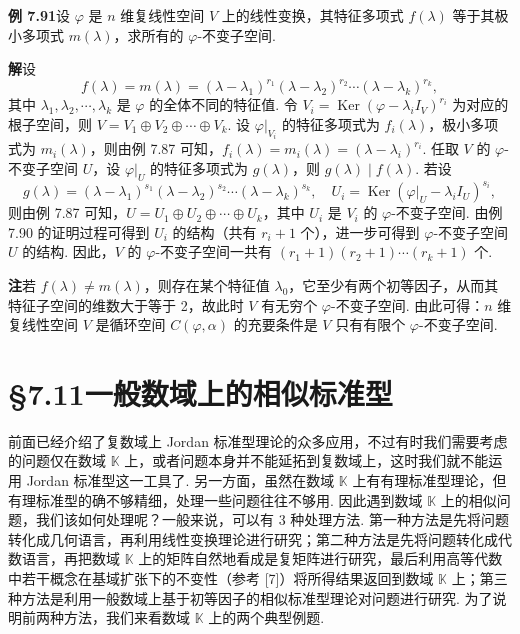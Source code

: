 \documentclass[UTF8,12pt,a4paper,fontset=fandol]{ctexart}
\begin{document}
\noindent\textbf{例 7.91}\quad 设 $\varphi$ 是 $n$ 维复线性空间 $V$ 上的线性变换，其特征多项式 $f(\lambda)$ 等于其极小多项式 $m(\lambda)$，求所有的 $\varphi$-不变子空间.

\noindent\textbf{解}\quad 设
\[
f(\lambda)=m(\lambda)=(\lambda-\lambda_1)^{r_1}(\lambda-\lambda_2)^{r_2}\cdots(\lambda-\lambda_k)^{r_k},
\]
其中 $\lambda_1,\lambda_2,\cdots,\lambda_k$ 是 $\varphi$ 的全体不同的特征值. 令 $V_i=\operatorname{Ker}(\varphi-\lambda_iI_V)^{r_i}$ 为对应的根子空间，则 $V=V_1\oplus V_2\oplus\cdots\oplus V_k$. 设 $\varphi|_{V_i}$ 的特征多项式为 $f_i(\lambda)$，极小多项式为 $m_i(\lambda)$，则由例 7.87 可知，$f_i(\lambda)=m_i(\lambda)=(\lambda-\lambda_i)^{r_i}$. 任取 $V$ 的 $\varphi$-不变子空间 $U$，设 $\varphi|_U$ 的特征多项式为 $g(\lambda)$，则 $g(\lambda)\mid f(\lambda)$. 若设
\[
g(\lambda)=(\lambda-\lambda_1)^{s_1}(\lambda-\lambda_2)^{s_2}\cdots(\lambda-\lambda_k)^{s_k},\quad U_i=\operatorname{Ker}(\varphi|_U-\lambda_iI_U)^{s_i},
\]
则由例 7.87 可知，$U=U_1\oplus U_2\oplus\cdots\oplus U_k$，其中 $U_i$ 是 $V_i$ 的 $\varphi$-不变子空间. 由例 7.90 的证明过程可得到 $U_i$ 的结构（共有 $r_i+1$ 个），进一步可得到 $\varphi$-不变子空间 $U$ 的结构. 因此，$V$ 的 $\varphi$-不变子空间一共有 $(r_1+1)(r_2+1)\cdots(r_k+1)$ 个.

\noindent\textbf{注}\quad 若 $f(\lambda)\ne m(\lambda)$，则存在某个特征值 $\lambda_0$，它至少有两个初等因子，从而其特征子空间的维数大于等于 2，故此时 $V$ 有无穷个 $\varphi$-不变子空间. 由此可得：$n$ 维复线性空间 $V$ 是循环空间 $C(\varphi,\alpha)$ 的充要条件是 $V$ 只有有限个 $\varphi$-不变子空间.

\section*{§7.11\quad 一般数域上的相似标准型}

前面已经介绍了复数域上 Jordan 标准型理论的众多应用，不过有时我们需要考虑的问题仅在数域 $\mathbb{K}$ 上，或者问题本身并不能延拓到复数域上，这时我们就不能运用 Jordan 标准型这一工具了. 另一方面，虽然在数域 $\mathbb{K}$ 上有有理标准型理论，但有理标准型的确不够精细，处理一些问题往往不够用. 因此遇到数域 $\mathbb{K}$ 上的相似问题，我们该如何处理呢？一般来说，可以有 3 种处理方法. 第一种方法是先将问题转化成几何语言，再利用线性变换理论进行研究；第二种方法是先将问题转化成代数语言，再把数域 $\mathbb{K}$ 上的矩阵自然地看成是复矩阵进行研究，最后利用高等代数中若干概念在基域扩张下的不变性（参考 [7]）将所得结果返回到数域 $\mathbb{K}$ 上；第三种方法是利用一般数域上基于初等因子的相似标准型理论对问题进行研究. 为了说明前两种方法，我们来看数域 $\mathbb{K}$ 上的两个典型例题.
\end{document}
